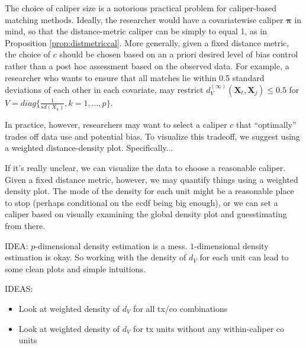 \documentclass{article}
\newcommand{\Xt}{\mathbf{X}_t}
\newcommand{\Xj}{\mathbf{X}_j}
\begin{document}
The choice of caliper size is a notorious practical problem for caliper-based matching methods.
Ideally, the researcher would have a covariatewise caliper $\boldsymbol{\pi}$ in mind, so that the distance-metric caliper can be simply to equal 1, as in Proposition \ref{prop:distmetriccal}.
More generally, given a fixed distance metric, the choice of $c$ should be chosen based on an a priori desired level of bias control rather than a post hoc assessment based on the observed data.
For example, a researcher who wants to ensure that all matches lie within 0.5 standard deviations of each other in each covariate, may restrict $d_V^{(\infty)}(\Xt, \Xj) \leq 0.5$ for $V = diag\{\frac{1}{sd(X_k)}, k=1, \dots, p\}$.

In practice, however, researchers may want to select a caliper $c$ that ``optimally'' trades off data use and potential bias.
To visualize this tradeoff, we suggest using a weighted distance-density plot.
Specifically...

If it's really unclear, we can visualize the data to choose a reasonable caliper.
Given a fixed distance metric, however, we may quantify things using a weighted density plot.
The mode of the density for each unit might be a reasonable place to stop (perhaps conditional on the ecdf being big enough), or we can set a caliper based on visually examining the global density plot and guesstimating from there.

IDEA: $p$-dimensional density estimation is a mess.
$1$-dimensional density estimation is okay.
So working with the density of $d_V$ for each unit can lead to some clean plots and simple intuitions.

IDEAS:
\begin{itemize}
    \item Look at weighted density of $d_V$ for all tx/co combinations
    \item Look at weighted density of $d_V$ for tx units without any within-caliper co units
\end{itemize}


\end{document}
